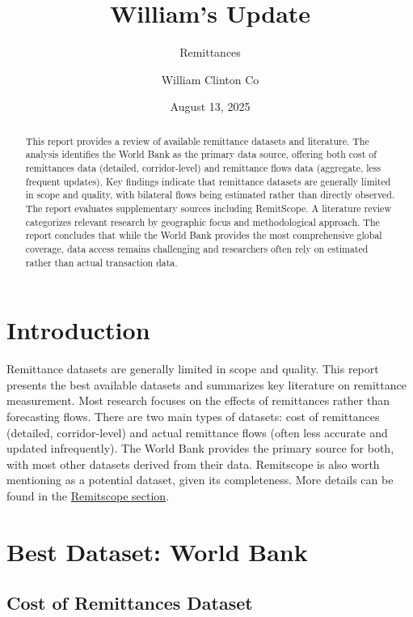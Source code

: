 \documentclass[
  11pt,
]{article}
\title{William's Update}
\subtitle{Remittances}
\author{William Clinton Co}
\date{August 13, 2025}
\renewcommand*\contentsname{Table of contents}
\newcommand\contentsname{Table of contents}
\begin{document}
\maketitle
\begin{abstract}
This report provides a review of available remittance datasets and
literature. The analysis identifies the World Bank as the primary data
source, offering both cost of remittances data (detailed,
corridor-level) and remittance flows data (aggregate, less frequent
updates). Key findings indicate that remittance datasets are generally
limited in scope and quality, with bilateral flows being estimated
rather than directly observed. The report evaluates supplementary
sources including RemitScope. A literature review categorizes relevant
research by geographic focus and methodological approach. The report
concludes that while the World Bank provides the most comprehensive
global coverage, data access remains challenging and researchers often
rely on estimated rather than actual transaction data.
\end{abstract}

\renewcommand*\contentsname{Table of contents}
{
\hypersetup{linkcolor=}
\setcounter{tocdepth}{30}
\tableofcontents
}

\section{Introduction}\label{introduction}

Remittance datasets are generally limited in scope and quality. This
report presents the best available datasets and summarizes key
literature on remittance measurement. Most research focuses on the
effects of remittances rather than forecasting flows. There are two main
types of datasets: cost of remittances (detailed, corridor-level) and
actual remittance flows (often less accurate and updated infrequently).
The World Bank provides the primary source for both, with most other
datasets derived from their data. Remitscope is also worth mentioning as
a potential dataset, given its completeness. More details can be found
in the \hyperref[remitscope]{Remitscope section}.

\section{Best Dataset: World Bank}\label{best-dataset-world-bank}

\subsection{Cost of Remittances
Dataset}\label{cost-of-remittances-dataset}
\end{document}
